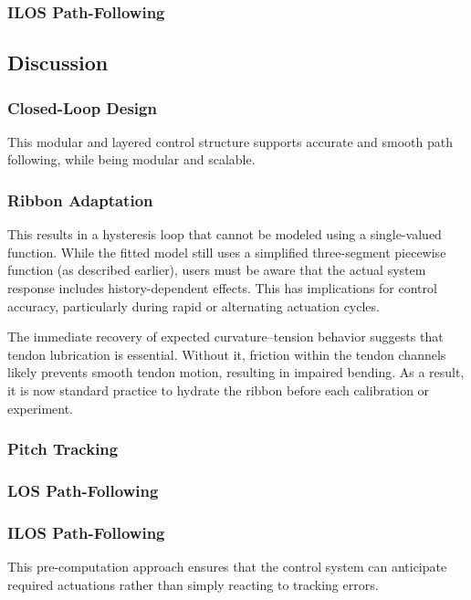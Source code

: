 \subsubsection{ILOS Path-Following}


\subsection{Discussion}

\subsubsection{Closed-Loop Design}
This modular and layered control structure supports accurate and smooth path following, while being modular and scalable. 

\subsubsection{Ribbon Adaptation}
This results in a hysteresis loop that cannot be modeled using a single-valued function. While the fitted model still uses a simplified three-segment piecewise function (as described earlier), users must be aware that the actual system response includes history-dependent effects. This has implications for control accuracy, particularly during rapid or alternating actuation cycles.

The immediate recovery of expected curvature–tension behavior suggests that tendon lubrication is essential. Without it, friction within the tendon channels likely prevents smooth tendon motion, resulting in impaired bending. As a result, it is now standard practice to hydrate the ribbon before each calibration or experiment.



\subsubsection{Pitch Tracking}

\subsubsection{LOS Path-Following}

\subsubsection{ILOS Path-Following}

This pre-computation approach ensures that the control system can anticipate required actuations rather than simply reacting to tracking errors. 

